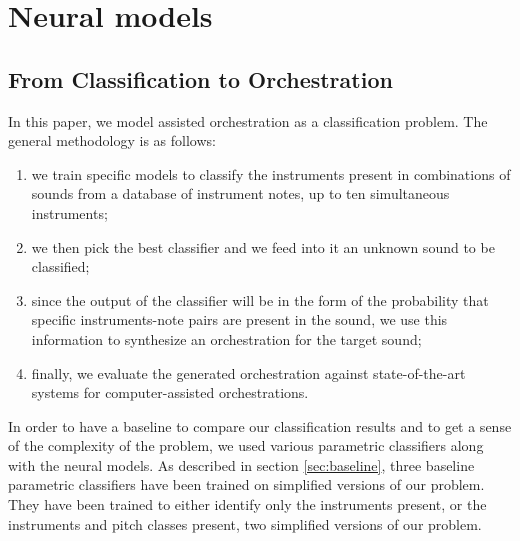 \documentclass[runningheads,a4paper]{llncs}
\begin{document}
\section{Neural models}
\label{sec:models}

\subsection{From Classification to Orchestration}

In this paper, we model assisted orchestration as a classification problem. The general methodology is as follows:

\begin{enumerate}
\item we train specific models to classify the instruments present in combinations of sounds from a database of instrument notes, up to ten simultaneous instruments;
\item we then pick the best classifier and we feed into it an unknown sound to be classified;
\item since the output of the classifier will be in the form of the probability that specific instruments-note pairs are present in the sound, we use this information to synthesize an orchestration for the target sound;
\item finally, we evaluate the generated orchestration against state-of-the-art systems for computer-assisted orchestrations.
\end{enumerate}

In order to have a baseline to compare our classification results and to get a sense of the complexity of the problem, we used various parametric classifiers along with the neural models. As described in section \ref{sec:baseline}, three baseline parametric classifiers have been trained on simplified versions of our problem. They have been trained to either identify only the instruments present, or the instruments and pitch classes present, two simplified versions of our problem.
\end{document}
